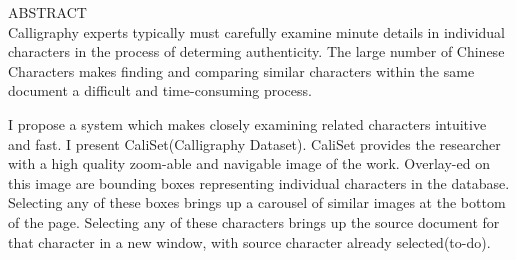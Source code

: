 ABSTRACT\\

Calligraphy experts typically must carefully examine minute details in individual characters in the process of determing authenticity.  The large number of Chinese Characters makes finding and comparing similar characters within the same document a difficult and time-consuming process.

I propose a system which makes closely examining related characters intuitive and fast.  I present CaliSet(Calligraphy Dataset).  CaliSet provides the researcher with a high quality zoom-able and navigable image of the work.  Overlay-ed on this image are bounding boxes representing individual characters in the database.  Selecting any of these boxes brings up a carousel of similar images at the bottom of the page.  Selecting any of these characters brings up the source document for that character in a new window, with source character already selected(to-do).  

\newpage
